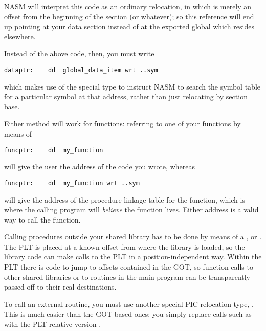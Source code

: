NASM will interpret this code as an ordinary relocation, in which
 is merely an offset from the beginning of the
 section (or whatever); so this reference will end up
pointing at your data section instead of at the exported global
which resides elsewhere.

Instead of the above code, then, you must write

\begin{lstlisting}
dataptr:    dd  global_data_item wrt ..sym
\end{lstlisting}

which makes use of the special  type 
 to instruct NASM to search the symbol table for a particular
symbol at that address, rather than just relocating by section base.

Either method will work for functions: referring to one of your
functions by means of

\begin{lstlisting}
funcptr:    dd  my_function
\end{lstlisting}

will give the user the address of the code you wrote, whereas

\begin{lstlisting}
funcptr:    dd  my_function wrt ..sym
\end{lstlisting}

will give the address of the procedure linkage table for the
function, which is where the calling program will \emph{believe} the
function lives. Either address is a valid way to call the function.


Calling procedures outside your shared library has to be done by
means of a , or .
The PLT is placed at a known offset from where the library is loaded,
so the library code can make calls to the PLT in a position-independent
way. Within the PLT there is code to jump to offsets contained in
the GOT, so function calls to other shared libraries or to routines
in the main program can be transparently passed off to their real
destinations.

To call an external routine, you must use another special PIC
relocation type, . This is
much easier than the GOT-based ones: you simply replace calls such as
 with the PLT-relative version .

